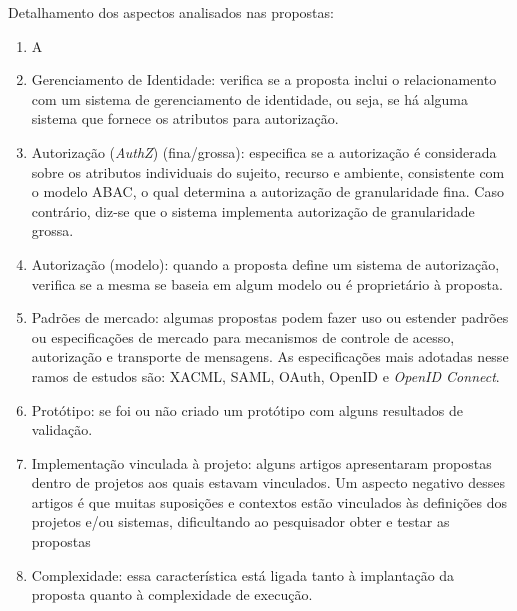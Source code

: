 Detalhamento dos aspectos analisados nas propostas:
\begin{enumerate}
	\item A
	\item Gerenciamento de Identidade: verifica se a proposta inclui o relacionamento com um sistema de gerenciamento de identidade, ou seja, se há alguma sistema que fornece os atributos para autorização.
	\item Autorização (\textit{AuthZ}) (fina/grossa): especifica se a autorização é considerada sobre os atributos individuais do sujeito, recurso e ambiente, consistente com o modelo ABAC, o qual determina a autorização de granularidade fina. Caso contrário, diz-se que o sistema implementa autorização de granularidade grossa.
	\item Autorização (modelo): quando a proposta define um sistema de autorização, verifica se a mesma se baseia em algum modelo ou é proprietário à proposta.
	\item Padrões de mercado: algumas propostas podem fazer uso ou estender padrões ou especificações de mercado para mecanismos de controle de acesso, autorização e transporte de mensagens. As especificações mais adotadas nesse ramos de estudos são: XACML, SAML, OAuth, OpenID e \textit{OpenID Connect}.
	\item Protótipo: se foi ou não criado um protótipo com alguns resultados de validação.
	\item Implementação vinculada à projeto: alguns artigos apresentaram propostas dentro de projetos aos quais estavam vinculados. Um aspecto negativo desses artigos é que muitas suposições e contextos estão vinculados às definições dos projetos e/ou sistemas, dificultando ao pesquisador obter e testar as propostas
	\item Complexidade: essa característica está ligada tanto à implantação da proposta quanto à complexidade de execução.	
\end{enumerate}
